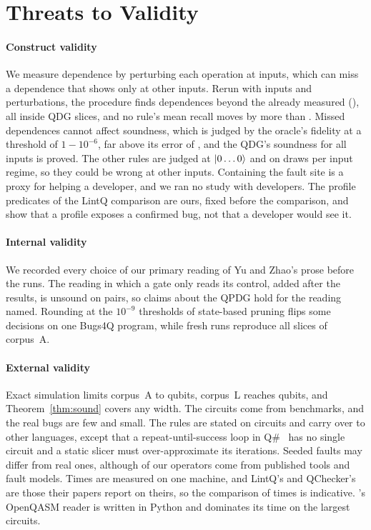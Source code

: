 \section{Threats to Validity}\label{sec:threats}

\paragraph*{Construct validity}
We measure dependence by perturbing each operation at \numInfluenceInputs{} inputs, which can miss a
dependence that shows only at other inputs. Rerun with \numGcInputs{} inputs and \numGcPerturbations{}
perturbations, the procedure finds \numGcDepsNew{} dependences
beyond the \numGcDepsBefore{} already measured (\numGcDepsNewPct{}), all inside QDG slices, and no rule's
mean recall moves by more than \numGcRecallShiftQ{}. Missed dependences cannot affect soundness, which is judged by the oracle's
fidelity at a threshold of $1 - 10^{-6}$, far above its error of \numOracleErr{}, and the QDG's soundness
for all inputs is proved. The other rules are judged
at $\lvert 0\dots0\rangle$ and on \numRobDraws{} draws per input regime, so they could be wrong at other inputs.
Containing the fault site is a proxy for helping a developer, and we ran no study with developers. The
profile predicates of the LintQ comparison are ours, fixed before the comparison, and show that a profile
exposes a confirmed bug, not that a developer would see it.

\paragraph*{Internal validity}
We recorded every choice of our primary reading of Yu and Zhao's prose before the runs. The reading in which a gate only reads its control, added after the results, is unsound on \numYzRoUnsound{} pairs, so claims
about the QPDG hold for the reading named. Rounding at the $10^{-9}$ thresholds of state-based pruning
flips some decisions on one Bugs4Q program, while \numQRepeatRuns{} fresh runs reproduce all
\numQRepeatPairs{} slices of corpus~A.

\paragraph*{External validity}
Exact simulation limits corpus~A to \numMaxQubits{} qubits, corpus~L reaches
\numCorpusLMaxQubits{} qubits, and Theorem~\ref{thm:sound} covers any width. The circuits come from
benchmarks, and the real bugs are few and small. The rules are stated on circuits and carry over to
other languages, except that a repeat-until-success loop in Q\#~\cite{svore2018qsharp} has no single
circuit and a static slicer must over-approximate its iterations. Seeded faults may differ from
real ones, although \numMutPublished{} of our \numMutOperators{} operators come from published tools and
fault models. Times are measured on one machine, and LintQ's and QChecker's are those their papers report on
theirs, so the comparison of times is indicative. \tool{}'s OpenQASM reader is written in Python and dominates its
time on the largest circuits.
